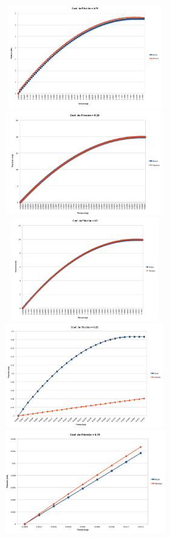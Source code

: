 \documentclass{article}
\begin{document}
\begin{itemize}
\includegraphics[width=7cm, height=4.5cm]{image001.png}
\includegraphics[width=7cm, height=4.5cm]{image002.png}
\includegraphics[width=7cm, height=4.5cm]{image003.png}
\includegraphics[width=7cm, height=4.5cm]{image004.png}
\includegraphics[width=7cm, height=4.5cm]{image005.png}

\end{itemize}
\end{document}
